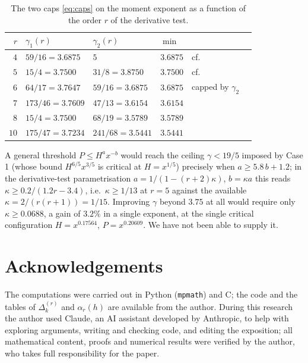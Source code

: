 \documentclass[11pt,reqno]{amsart}
\theoremstyle{plain}
\theoremstyle{definition}
\numberwithin{equation}{section}
\begin{document}
\begin{table}[ht]
\caption{The two caps \eqref{eq:caps} on the moment exponent as a function of the order $r$
of the derivative test.}
\label{tab:gamma}
\begin{tabular}{rlllll}
\toprule
$r$ & $\gamma_1(r)$ & $\gamma_2(r)$ & $\min$ & \\
\midrule
$4$ & $59/16=3.6875$ & $5$ & $3.6875$ & cf.\ \cite{Huxley2000}\\
$5$ & $15/4=3.7500$ & $31/8=3.8750$ & $\mathbf{3.7500}$ & cf.\ \cite{Chan}\\
$6$ & $64/17=3.7647$ & $59/16=3.6875$ & $3.6875$ & capped by $\gamma_2$\\
$7$ & $173/46=3.7609$ & $47/13=3.6154$ & $3.6154$ &\\
$8$ & $15/4=3.7500$ & $68/19=3.5789$ & $3.5789$ &\\
$10$ & $175/47=3.7234$ & $241/68=3.5441$ & $3.5441$ &\\
\bottomrule
\end{tabular}
\end{table}

A general threshold $P\le H^{a}x^{-b}$ would reach the ceiling $\gamma<19/5$ imposed by
Case 1 (whose bound $H^{6/5}x^{3/5}$ is critical at $H=x^{1/5}$) precisely when
$a\ge5.8\,b+1.2$; in the derivative-test parametrisation $a=1/(1-(r+2)\kappa)$, $b=\kappa a$
this reads $\kappa\ge0.2/(1.2r-3.4)$, i.e.\ $\kappa\ge1/13$ at $r=5$ against the available
$\kappa=2/(r(r+1))=1/15$. Improving $\gamma$ beyond $3.75$ at all would require only
$\kappa\ge0.0688$, a gain of $3.2\%$ in a single exponent, at the single critical
configuration $H=x^{0.17564}$, $P=x^{0.20609}$. We have not been able to supply it.

\section*{Acknowledgements}
The computations were carried out in Python (\texttt{mpmath}) and C; the code and the
tables of $\Delta^{(r)}_k$ and $\alpha_r(h)$ are available from the author.
During this research the author used Claude, an AI assistant developed by Anthropic, to
help with exploring arguments, writing and checking code, and editing the exposition; all
mathematical content, proofs and numerical results were verified by the author, who takes
full responsibility for the paper.
\end{document}
